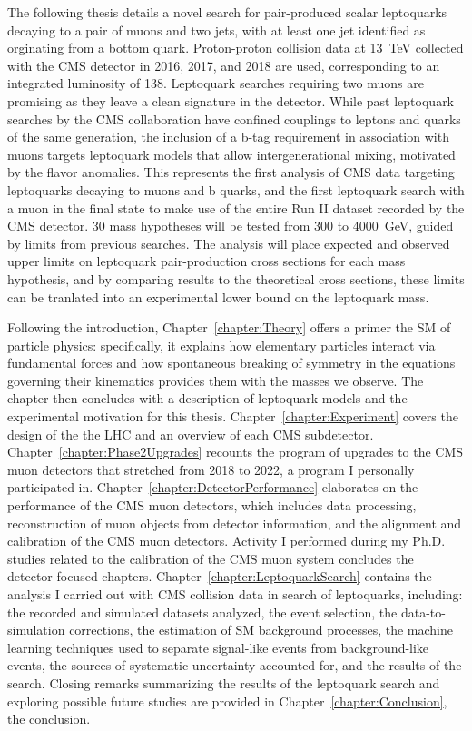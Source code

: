 The following thesis details a novel search for pair-produced scalar leptoquarks decaying to a pair of muons and two jets, with at least one jet identified as orginating from a bottom quark. Proton-proton collision data at \SI{13}{\TeV} collected with the CMS detector in 2016, 2017, and 2018 are used, corresponding to an integrated luminosity of \SI{138}{\invfb}. Leptoquark searches requiring two muons are promising as they leave a clean signature in the detector. While past leptoquark searches by the CMS collaboration have confined couplings to leptons and quarks of the same generation, the inclusion of a b-tag requirement in association with muons targets leptoquark models that allow intergenerational mixing, motivated by the flavor anomalies. This represents the first analysis of CMS data targeting leptoquarks decaying to muons and b quarks, and the first leptoquark search with a muon in the final state to make use of the entire Run II dataset recorded by the CMS detector. 30 mass hypotheses will be tested from 300 to \SI{4000}{\GeV}, guided by limits from previous searches. The analysis will place expected and observed upper limits on leptoquark pair-production cross sections for each mass hypothesis, and by comparing results to the theoretical cross sections, these limits can be tranlated into an experimental lower bound on the leptoquark mass.

Following the introduction, Chapter~\ref{chapter:Theory} offers a primer the SM of particle physics: specifically, it explains how elementary particles interact via fundamental forces and how spontaneous breaking of symmetry in the equations governing their kinematics provides them with the masses we observe. The chapter then concludes with a description of leptoquark models and the experimental motivation for this thesis. Chapter~\ref{chapter:Experiment} covers the design of the the LHC and an overview of each CMS subdetector. Chapter~\ref{chapter:Phase2Upgrades} recounts the program of upgrades to the CMS muon detectors that stretched from 2018 to 2022, a program I personally participated in. Chapter~\ref{chapter:DetectorPerformance} elaborates on the performance of the CMS muon detectors, which includes data processing, reconstruction of muon objects from detector information, and the alignment and calibration of the CMS muon detectors. Activity I performed during my Ph.D. studies related to the calibration of the CMS muon system concludes the detector-focused chapters. Chapter~\ref{chapter:LeptoquarkSearch} contains the analysis I carried out with CMS collision data in search of leptoquarks, including: the recorded and simulated datasets analyzed, the event selection, the data-to-simulation corrections, the estimation of SM background processes, the machine learning techniques used to separate signal-like events from background-like events, the sources of systematic uncertainty accounted for, and the results of the search. Closing remarks summarizing the results of the leptoquark search and exploring possible future studies are provided in Chapter~\ref{chapter:Conclusion}, the conclusion.  